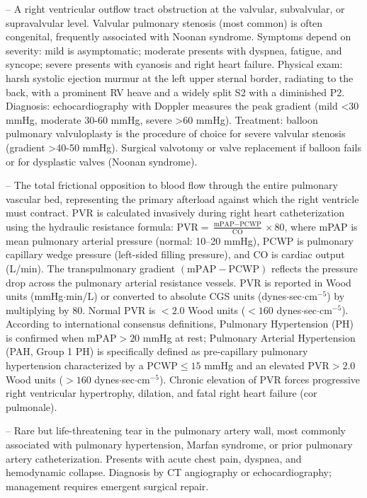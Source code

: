 -- A right ventricular outflow tract obstruction at the valvular, subvalvular, or supravalvular level. Valvular pulmonary stenosis (most common) is often congenital, frequently associated with Noonan syndrome. Symptoms depend on severity: mild is asymptomatic; moderate presents with dyspnea, fatigue, and syncope; severe presents with cyanosis and right heart failure. Physical exam: harsh systolic ejection murmur at the left upper sternal border, radiating to the back, with a prominent RV heave and a widely split S2 with a diminished P2. Diagnosis: echocardiography with Doppler measures the peak gradient (mild <30 mmHg, moderate 30-60 mmHg, severe >60 mmHg). Treatment: balloon pulmonary valvuloplasty is the procedure of choice for severe valvular stenosis (gradient >40-50 mmHg). Surgical valvotomy or valve replacement if balloon fails or for dysplastic valves (Noonan syndrome).

-- The total frictional opposition to blood flow through the entire pulmonary vascular bed, representing the primary afterload against which the right ventricle must contract. PVR is calculated invasively during right heart catheterization using the hydraulic resistance formula: $\text{PVR} = \frac{\text{mPAP} - \text{PCWP}}{\text{CO}} \times 80$, where mPAP is mean pulmonary arterial pressure (normal: 10--20 mmHg), PCWP is pulmonary capillary wedge pressure (left-sided filling pressure), and CO is cardiac output (L/min). The transpulmonary gradient $(\text{mPAP} - \text{PCWP})$ reflects the pressure drop across the pulmonary arterial resistance vessels. PVR is reported in Wood units (mmHg$\cdot$min/L) or converted to absolute CGS units (dynes$\cdot$sec$\cdot$cm$^{-5}$) by multiplying by 80. Normal PVR is $<2.0$ Wood units ($<160$ dynes$\cdot$sec$\cdot$cm$^{-5}$). According to international consensus definitions, Pulmonary Hypertension (PH) is confirmed when $\text{mPAP} > 20$ mmHg at rest; Pulmonary Arterial Hypertension (PAH, Group 1 PH) is specifically defined as pre-capillary pulmonary hypertension characterized by a $\text{PCWP} \le 15$ mmHg and an elevated $\text{PVR} > 2.0$ Wood units ($>160$ dynes$\cdot$sec$\cdot$cm$^{-5}$). Chronic elevation of PVR forces progressive right ventricular hypertrophy, dilation, and fatal right heart failure (cor pulmonale).

-- Rare but life-threatening tear in the pulmonary artery wall, most commonly associated with pulmonary hypertension, Marfan syndrome, or prior pulmonary artery catheterization. Presents with acute chest pain, dyspnea, and hemodynamic collapse. Diagnosis by CT angiography or echocardiography; management requires emergent surgical repair.

